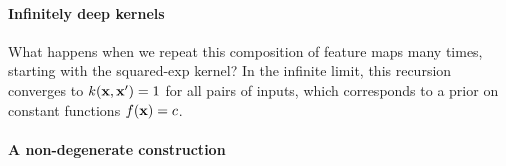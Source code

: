 \documentclass[twoside]{article}
\begin{document}
\paragraph{Infinitely deep kernels}
What happens when we repeat this composition of feature maps many times, starting with the squared-exp kernel?  In the infinite limit, this recursion converges to $k({\bf{x}},{\bf{x}}') = 1$ for all pairs of inputs, which corresponds to a prior on constant functions $f({\bf{x}}) = c$.

%

\paragraph{A non-degenerate construction}
\end{document}
